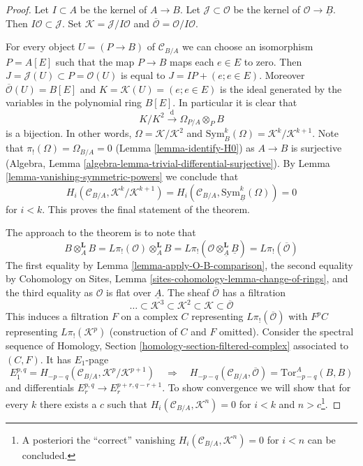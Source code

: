 \documentclass{stacks-project}
\theoremstyle{plain}
\theoremstyle{definition}
\theoremstyle{remark}
\numberwithin{equation}{subsection}
\begin{document}
\begin{proof}
Let $I \subset A$ be the kernel of $A \to B$. Let
$\mathcal{J} \subset \mathcal{O}$
be the kernel of $\mathcal{O} \to \underline{B}$. Then
$I\mathcal{O} \subset \mathcal{J}$. Set
$\mathcal{K} = \mathcal{J}/I\mathcal{O}$ and
$\overline{\mathcal{O}} = \mathcal{O}/I\mathcal{O}$.

\medskip\noindent
For every object $U = (P \to B)$ of $\mathcal{C}_{B/A}$
we can choose an isomorphism $P = A[E]$ such that the map
$P \to B$ maps each $e \in E$ to zero. Then
$J = \mathcal{J}(U) \subset P = \mathcal{O}(U)$
is equal to $J = IP + (e; e \in E)$. Moreover
$\overline{\mathcal{O}}(U) = B[E]$ and $K = \mathcal{K}(U) = (e; e \in E)$
is the ideal generated by the variables in the polynomial ring $B[E]$.
In particular it is clear that
$$
K/K^2 \xrightarrow{\text{d}} \Omega_{P/A} \otimes_P B
$$
is a bijection. In other words, $\Omega = \mathcal{K}/\mathcal{K}^2$
and $\text{Sym}_B^k(\Omega) = \mathcal{K}^k/\mathcal{K}^{k + 1}$.
Note that $\pi_!(\Omega) = \Omega_{B/A} = 0$ (Lemma \ref{lemma-identify-H0})
as $A \to B$ is surjective
(Algebra, Lemma \ref{algebra-lemma-trivial-differential-surjective}).
By Lemma \ref{lemma-vanishing-symmetric-powers} we conclude that
$$
H_i(\mathcal{C}_{B/A}, \mathcal{K}^k/\mathcal{K}^{k + 1}) =
H_i(\mathcal{C}_{B/A}, \text{Sym}^k_{\underline{B}}(\Omega)) = 0
$$
for $i < k$. This proves the final statement of the theorem.

\medskip\noindent
The approach to the theorem is to note that
$$
B \otimes_A^\mathbf{L} B = L\pi_!(\mathcal{O}) \otimes_A^\mathbf{L} B =
L\pi_!(\mathcal{O} \otimes_{\underline{A}}^\mathbf{L} \underline{B}) =
L\pi_!(\overline{\mathcal{O}})
$$
The first equality by Lemma \ref{lemma-apply-O-B-comparison},
the second equality by
Cohomology on Sites, Lemma \ref{sites-cohomology-lemma-change-of-rings}, and
the third equality as $\mathcal{O}$ is flat over $\underline{A}$.
The sheaf $\overline{\mathcal{O}}$ has a filtration
$$
\ldots \subset
\mathcal{K}^3 \subset
\mathcal{K}^2 \subset
\mathcal{K} \subset
\overline{\mathcal{O}}
$$
This induces a filtration $F$ on a complex $C$ representing
$L\pi_!(\overline{\mathcal{O}})$ with $F^pC$ representing
$L\pi_!(\mathcal{K}^p)$ (construction of $C$ and $F$ omitted).
Consider the spectral sequence of
Homology, Section \ref{homology-section-filtered-complex}
associated to $(C, F)$. It has $E_1$-page
$$
E_1^{p, q} = H_{- p - q}(\mathcal{C}_{B/A}, \mathcal{K}^p/\mathcal{K}^{p + 1})
\quad\Rightarrow\quad
H_{- p - q}(\mathcal{C}_{B/A}, \overline{\mathcal{O}}) = 
\text{Tor}_{- p - q}^A(B, B)
$$
and differentials $E_r^{p, q} \to E_r^{p + r, q - r + 1}$. To show convergence
we will show that for every $k$ there exists a $c$ such that
$H_i(\mathcal{C}_{B/A}, \mathcal{K}^n) = 0$
for $i < k$ and $n > c$\footnote{A posteriori
the ``correct'' vanishing $H_i(\mathcal{C}_{B/A}, \mathcal{K}^n) = 0$ for
$i < n$ can be concluded.}.


\end{proof}
\end{document}
